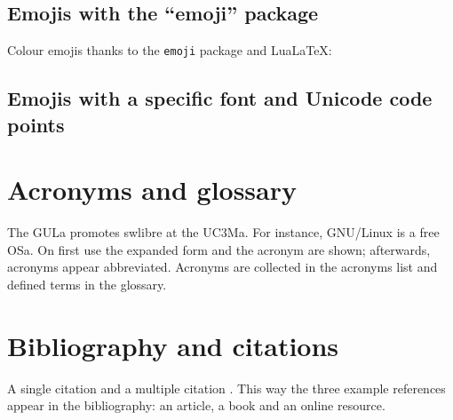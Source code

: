
\subsection{Emojis with the ``emoji'' package}

Colour emojis thanks to the \texttt{emoji} package and LuaLaTeX:


\subsection{Emojis with a specific font and Unicode code points}

%
%
%
%



\section{Acronyms and glossary}

The \gls{GULa} promotes \gls{swlibre} at the \gls{UC3Ma}. For instance,
GNU/Linux is a free \gls{OSa}. On first use the
expanded form and the acronym are shown; afterwards, acronyms appear
abbreviated. Acronyms are collected in the acronyms list and defined terms in
the glossary.



\section{Bibliography and citations}

A single citation \cite{prieto2014applications} and a multiple citation
\cite{knuth1984texbook, uc3m_earchivo}. This way the three example references
appear in the bibliography: an article, a book and an online resource.

